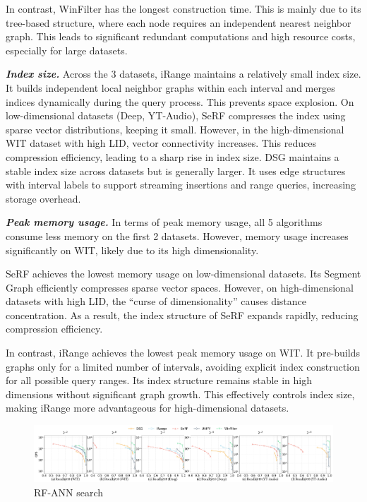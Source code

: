 \documentclass[sigconf, nonacm]{acmart}
\begin{document}
In contrast, WinFilter has the longest construction time. This is mainly due to its tree-based structure, where each node requires an independent nearest neighbor graph. This leads to significant redundant computations and high resource costs, especially for large datasets.






\textit{\textbf{Index size.}} Across the 3 datasets, iRange maintains a relatively small index size. It builds independent local neighbor graphs within each interval and merges indices dynamically during the query process. This prevents space explosion. On low-dimensional datasets (Deep, YT-Audio), SeRF compresses the index using sparse vector distributions, keeping it small. However, in the high-dimensional WIT dataset with high LID, vector connectivity increases. This reduces compression efficiency, leading to a sharp rise in index size. DSG maintains a stable index size across datasets but is generally larger. It uses edge structures with interval labels to support streaming insertions and range queries, increasing storage overhead.


\textit{\textbf{Peak memory usage.}}
In terms of peak memory usage, all 5 algorithms consume less memory on the first 2 datasets. However, memory usage increases significantly on WIT, likely due to its high dimensionality.

SeRF achieves the lowest memory usage on low-dimensional datasets. Its Segment Graph efficiently compresses sparse vector spaces. However, on high-dimensional datasets with high LID, the “curse of dimensionality” causes distance concentration. As a result, the index structure of SeRF expands rapidly, reducing compression efficiency.

In contrast, iRange achieves the lowest peak memory usage on WIT. It pre-builds graphs only for a limited number of intervals, avoiding explicit index construction for all possible query ranges. Its index structure remains stable in high dimensions without significant graph growth. This effectively controls index size, making iRange more advantageous for high-dimensional datasets.

\begin{figure}[htbp]
  \centering
  \setlength{\abovecaptionskip}{0cm}
    \setlength{\belowcaptionskip}{-0.4cm}
  \includegraphics[width=\textwidth]{figures/exp/exp_8_2.pdf}
  \caption{RF-ANN search }
  \label{fig:exp_8_2}
\end{figure}
\end{document}
